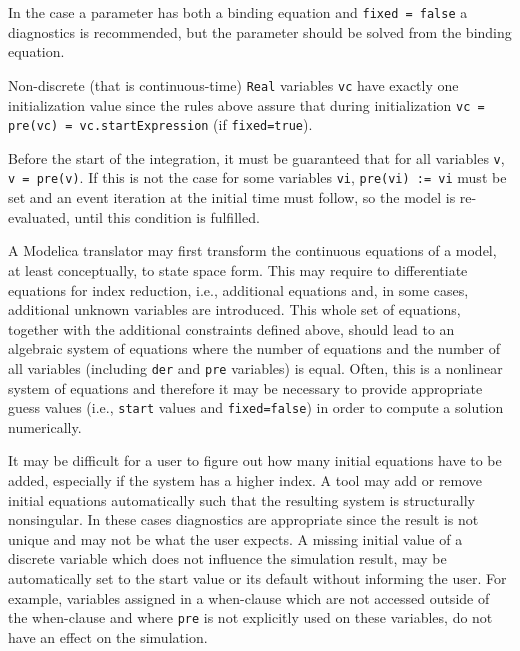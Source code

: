 \begin{nonnormative}
In the case a parameter has both a binding equation and \lstinline!fixed = false! a diagnostics is recommended, but the parameter should be solved from the binding equation.

Non-discrete (that is continuous-time) \lstinline!Real! variables \lstinline!vc! have exactly one initialization value since the rules above assure that during initialization
\lstinline!vc = pre(vc) = vc.startExpression! (if \lstinline!fixed=true!).

Before the start of the integration, it must be guaranteed that for all variables \lstinline!v!, \lstinline!v = pre(v)!. If this is not the case for some variables
\lstinline!vi!, \lstinline!pre(vi) := vi! must be set and an event iteration at the initial time must follow, so the model is re-evaluated, until this condition is fulfilled.

A Modelica translator may first transform the continuous equations of a model, at least conceptually, to state space form. This may require to differentiate equations for index
reduction, i.e., additional equations and, in some cases, additional unknown variables are introduced.  This whole set of equations, together with the additional constraints
defined above, should lead to an algebraic system of equations where the number of equations and the number of all variables (including \lstinline!der! and \lstinline!pre!
variables) is equal.  Often, this is a nonlinear system of equations and therefore it may be necessary to provide appropriate guess values (i.e., \lstinline!start! values and
\lstinline!fixed=false!) in order to compute a solution numerically.

It may be difficult for a user to figure out how many initial equations have to be added, especially if the system has a higher index. A tool may add or remove initial equations
automatically such that the resulting system is structurally nonsingular.  In these cases diagnostics are appropriate since the result is not unique and may not be what the user
expects.  A missing initial value of a discrete variable which does not influence the simulation result, may be automatically set to the start value or its default without
informing the user.  For example, variables assigned in a when-clause which are not accessed outside of the when-clause and where \lstinline!pre! is not explicitly
used on these variables, do not have an effect on the simulation.
\end{nonnormative}

